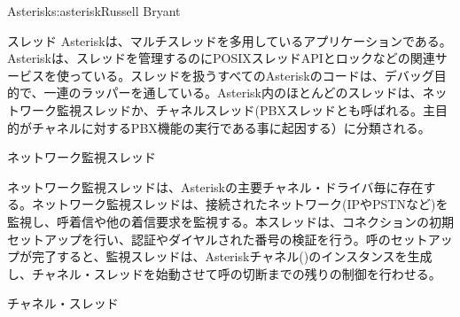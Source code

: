 \begin{aosachapter}{Asterisk}{s:asterisk}{Russell Bryant}
\begin{aosasect1}{スレッド}
Asteriskは、マルチスレッドを多用しているアプリケーションである。Asteriskは、スレッドを管理するのにPOSIXスレッドAPIとロックなどの関連サービスを使っている。スレッドを扱うすべてのAsteriskのコードは、デバッグ目的で、一連のラッパーを通している。Asterisk内のほとんどのスレッドは、ネットワーク監視スレッドか、チャネルスレッド(PBXスレッドとも呼ばれる。主目的がチャネルに対するPBX機能の実行である事に起因する）に分類される。

\begin{aosasect2}{ネットワーク監視スレッド}

ネットワーク監視スレッドは、Asteriskの主要チャネル・ドライバ毎に存在する。ネットワーク監視スレッドは、接続されたネットワーク(IPやPSTNなど)を監視し、呼着信や他の着信要求を監視する。本スレッドは、コネクションの初期セットアップを行い、認証やダイヤルされた番号の検証を行う。呼のセットアップが完了すると、監視スレッドは、Asteriskチャネル()のインスタンスを生成し、チャネル・スレッドを始動させて呼の切断までの残りの制御を行わせる。

\end{aosasect2}

\begin{aosasect2}{チャネル・スレッド}


\end{aosasect2}
\end{aosasect1}
\end{aosachapter}
